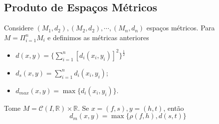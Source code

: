 \documentclass[metric_notes.tex]{subfiles}
\begin{document}
\subsection{Produto de Espaços Métricos}
Considere \((M_{1}, d_{2}), (M_{2}, d_{2}), \cdots, (M_{n}, d_{n})\) espaços métricos. Para \(M=\Pi_{i=1}^{n}M_{i}\) e definimos as métricas anteriores
\begin{itemize}
	\item \(d(x, y) = \biggl\{\sum\limits_{i=1}^{n}[d_{i}(x_{i}, y_{i})]^{2}\biggr\}^{\frac{1}{2}}\)
	\item \(d_{s}(x, y) = \sum\limits_{i=1}^{n}d_{i}(x_{i}, y_{i})\);
	\item \(d_{max}(x, y) = \max\{d_{i}(x_{i}, y_{i})\}\).
\end{itemize}
\begin{example}
	Tome \(M = \mathcal{C}(I, \mathbb{R})\times \mathbb{R}\). Se \(x = (f, s), y=(h, t)\), então
	\[
		d_{m}(x, y) = \max \biggl\{\rho (f, h), d(s, t)\biggr\}
	\]
\end{example}
\end{document}
